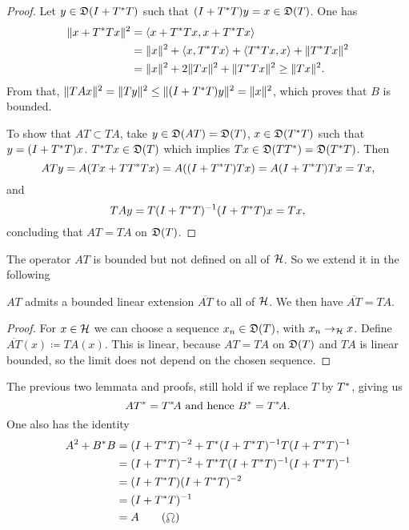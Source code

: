 \begin{proof}
 Let $y \in \mathfrak{D}(I + T ^{*} T)$ such that $(I + T ^{*} T)y = x \in \mathfrak{D}(T)$. One has 
 \begin{align*}
   \|x + T ^{*} T x\|^2 &= \left\langle x + T ^{*} T x, x + T ^{*} T x \right\rangle\\
   &= \|x\|^2 +  \left\langle x, T ^{*} Tx \right\rangle + \left\langle T ^{*} Tx, x \right\rangle+ \|T ^{*} Tx\|^2\\
   &= \|x\|^2 + 2\|Tx\|^2 + \|T ^{*} Tx\|^2 \geq \|Tx\|^2.
 \end{align*}
From that, $\| TAx\|^2 = \| Ty \| ^2 \leq \| (I + T ^{*} T)y \|^2 = \| x \| ^2$, which proves that $B$ is bounded. 

To show that $AT \subset TA$, take $y \in \mathfrak{D}(AT) = \mathfrak{D}(T)$, $x \in \mathfrak{D}(T ^{*} T)$ such that $y = ( I +  T ^{*} T)x$. $T ^{*} T x \in \mathfrak{D}(T)$ which implies $Tx \in \mathfrak{D}(TT^{*}) = \mathfrak{D}(T^{*} T)$. Then 
\[
 ATy = A(Tx + T T^{*} T x) = A((I + T^{*} T)Tx)= A(I+ T^{*} T)Tx= Tx,
\]
and
\[
 TAy= T(I+ T^{*} T)^{-1} (I + T ^{*} T)x=Tx,
\]
concluding that $AT = TA$ on $\mathfrak{D}(T)$.

\end{proof}

The operator $AT$ is bounded but not defined on all of $\mathcal{H}$. So we extend it in the following

\begin{lem}
 $AT$ admits a bounded linear extension $\overline{AT}$ to all of $\mathcal{H}$. We then have $\overline{AT}=TA$.
\end{lem}

\begin{proof}
 For $x \in \mathcal{H}$ we can choose a sequence $x_n \in \mathfrak{D}(T)$, with $x_n \rightarrow_{\mathcal{H}} x$. Define $\overline{AT}(x) \coloneqq TA(x)$. This is linear, because $AT = TA$ on $\mathfrak{D}(T)$ and $TA$ is linear bounded, so the limit does not depend on the chosen sequence.
\end{proof}

\begin{rem}
 The previous two lemmata and proofs, still hold if we replace $T$ by $T^{*}$, giving us 
 \[
  AT^{*} = T^{*} \! A \text{ and hence } B^{*} = T^{*} \! A.
 \]
 One also has the identity
 \begin{align*}
  A^2 + B^{*} B &= (I + T^{*} T)^{-2} + T ^{*} (I + T^{*} T)^{-1} T (I + T^{*} T) ^{-1} \\
		&= (I + T^{*} T)^{-2} + T ^{*} T(I + T^{*} T)^{-1} (I + T^{*} T) ^{-1} \\
		&= (I + T^{*} T)(I + T^{*} T)^{-2} \\
		&= (I + T^{*} T)^{-1}  \\
		&= A \tag{\leo}
  \end{align*}

  

\end{rem}


